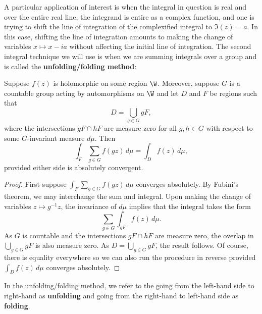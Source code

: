       A particular application of interest is when the integral in question is real and over the entire real line, the integrand is entire as a complex function, and one is trying to shift the line of integration of the complexified integral to $\Im(z) = a$. In this case, shifting the line of integration amounts to making the change of variables $x \mapsto x-ia$ without affecting the initial line of integration. The second integral technique we will use is when we are summing integrals over a group and is called the \textbf{unfolding/folding method}:

      \begin{theorem}
        Suppose $f(z)$ is holomorphic on some region $\W$. Moreover, suppose $G$ is a countable group acting by automorphisms on $\W$ and let $D$ and $F$ be regions such that
        \[
          D = \bigcup_{g \in G}gF,
        \]
        where the intersections $gF \cap hF$ are measure zero for all $g,h \in G$ with respect to some $G$-invariant measure $d\mu$. Then 
        \[
          \int_{F}\sum_{g \in G}f(g z)\,d\mu = \int_{D}f(z)\,d\mu,
        \]
        provided either side is absolutely convergent.
      \end{theorem}
      \begin{proof}
        First suppose $\int_{F}\sum_{g \in G}f(g z)\,d\mu$ converges absolutely. By Fubini's theorem, we may interchange the sum and integral. Upon making the change of variables $z \mapsto g^{-1}z$, the invariance of $d\mu$ implies that the integral takes the form
        \[
          \sum_{g \in G}\int_{gF}f(z)\,d\mu.
        \]
        As $G$ is countable and the intersections $gF \cap hF$ are measure zero, the overlap in $\bigcup_{g \in G}gF$ is also measure zero. As $D = \bigcup_{g \in G}gF$, the result follows. Of course, there is equality everywhere so we can also run the procedure in reverse provided $\int_{D}f(z)\,d\mu$ converges absolutely.
      \end{proof}

      In the unfolding/folding method, we refer to the going from the left-hand side to right-hand as \textbf{unfolding} and going from the right-hand to left-hand side as \textbf{folding}.
